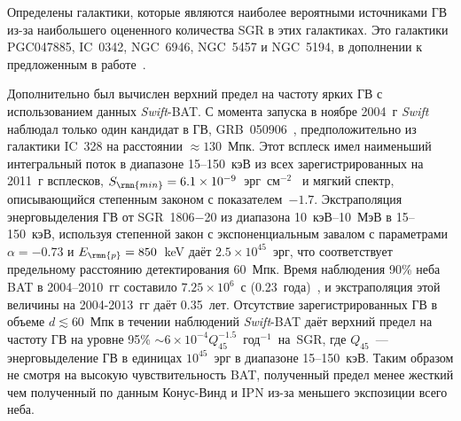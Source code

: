 Определены галактики, которые являются наиболее вероятными источниками ГВ 
из-за наибольшего оцененного количества SGR в этих галактиках. Это галактики
PGC047885, IC~0342, NGC~6946, NGC~5457 и NGC~5194, в дополнении к предложенным 
в работе~\citet{Popov2006}.

Дополнительно был вычислен верхний предел на частоту ярких ГВ с использованием 
данных \textit{Swift}-BAT. С момента запуска в ноябре 2004~г \textit{Swift} наблюдал 
только один кандидат в ГВ, GRB~050906~\citep{Levan2008}, предположительно из 
галактики IC~328 на расстоянии $\approx 130$~Мпк. Этот всплеск имел наименьший 
интегральный поток в диапазоне 15--150~кэВ из всех зарегистрированных на 2011~г всплесков, 
$S_{\rmn{min}} = 6.1\times10^{-9}$~эрг~см$^{-2}$~\citep{Sakamoto2011ApJS} и 
мягкий спектр, описывающийся степенным законом с показателем~$-1.7$. Экстраполяция 
энерговыделения ГВ от SGR~1806$-$20 из диапазона 10~кэВ--10~МэВ в 15--150~кэВ, 
используя степенной закон с экспоненциальным завалом с параметрами $\alpha=-0.73$ 
и $E_{\rmn{p}}=850$~keV даёт $2.5\times10^{45}$~эрг, что соответствует предельному 
расстоянию детектирования 60~Мпк. Время наблюдения 90\% неба BAT в 2004--2010~гг 
составило $7.25\times10^{6}$~с (0.23~года)~\citep{Baumgartner2013ApJS}, и экстраполяция 
этой величины на 2004-2013~гг даёт 0.35~лет. Отсутствие зарегистрированных ГВ в 
объеме $d \lesssim 60$~Мпк в течении наблюдений \textit{Swift}-BAT даёт верхний предел 
на частоту ГВ на уровне 95\% $\sim 6 \times 10^{-4} Q_{45}^{-1.5} $~год$^{-1}$~на~SGR, 
где $Q_{45}$~--- энерговыделение ГВ в единицах $10^{45}$~эрг в диапазоне 15--150~кэВ. 
Таким образом не смотря на высокую чувствительность BAT, полученный предел 
менее жесткий чем полученный по данным Конус-Винд и IPN из-за меньшего экспозиции всего неба.

\clearpage